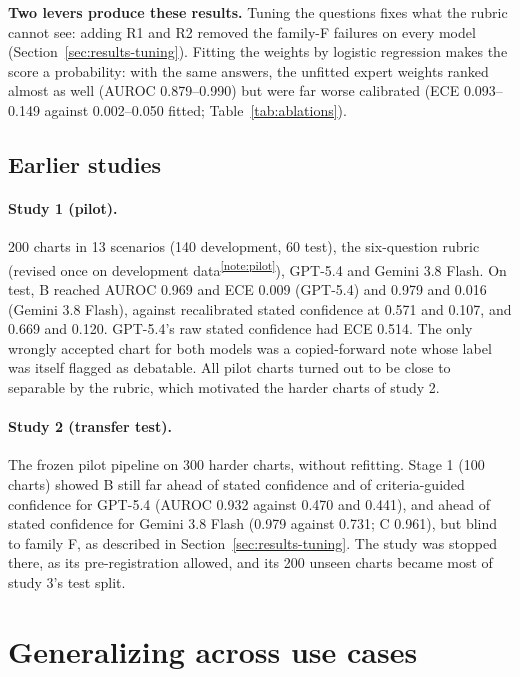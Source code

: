 \documentclass[10pt,letterpaper]{article}
\newcommand{\tnote}[1]{\textsuperscript{\hyperref[note:#1]{\ref*{note:#1}}}}
\begin{document}
\textbf{Two levers produce these results.} Tuning the questions fixes what the rubric cannot see: adding R1 and R2 removed the family-F failures on every model (Section~\ref{sec:results-tuning}). Fitting the weights by logistic regression makes the score a probability: with the same answers, the unfitted expert weights ranked almost as well (AUROC 0.879--0.990) but were far worse calibrated (ECE 0.093--0.149 against 0.002--0.050 fitted; Table~\ref{tab:ablations}).

\FloatBarrier
\subsection{Earlier studies}

\paragraph{Study 1 (pilot).} 200 charts in 13 scenarios (140 development, 60 test), the six-question rubric (revised once on development data\tnote{pilot}), GPT-5.4 and Gemini 3.8 Flash. On test, B reached AUROC 0.969 and ECE 0.009 (GPT-5.4) and 0.979 and 0.016 (Gemini 3.8 Flash), against recalibrated stated confidence at 0.571 and 0.107, and 0.669 and 0.120. GPT-5.4's raw stated confidence had ECE 0.514. The only wrongly accepted chart for both models was a copied-forward note whose label was itself flagged as debatable. All pilot charts turned out to be close to separable by the rubric, which motivated the harder charts of study 2.

\paragraph{Study 2 (transfer test).} The frozen pilot pipeline on 300 harder charts, without refitting. Stage 1 (100 charts) showed B still far ahead of stated confidence and of criteria-guided confidence for GPT-5.4 (AUROC 0.932 against 0.470 and 0.441), and ahead of stated confidence for Gemini 3.8 Flash (0.979 against 0.731; C 0.961), but blind to family F, as described in Section~\ref{sec:results-tuning}. The study was stopped there, as its pre-registration allowed, and its 200 unseen charts became most of study 3's test split.


\section{Generalizing across use cases}\label{sec:general}
\end{document}
